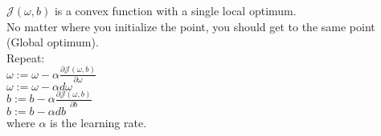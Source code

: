\documentclass{article}
\begin{document}
    $\mathcal{J}(\omega,b)$ is a convex function with a single local optimum.\\
    No matter where you initialize the point, you should get to the same point (Global optimum).\\

    Repeat: \\

        $\omega := \omega - \alpha \frac{\partial\mathcal{J}(\omega,b)}{\partial\omega}$\\

        $\omega := \omega - \alpha d\omega$\\

        $b := b - \alpha \frac{\partial\mathcal{J}(\omega,b)}{\partial b}$\\

        $b := b - \alpha db$\\

        where $\alpha$ is the learning rate.\\
\end{document}
